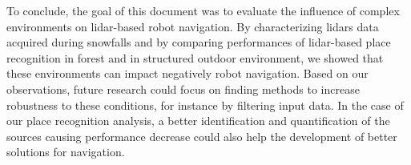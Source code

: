 To conclude, the goal of this document was to evaluate the influence of complex environments on \gls*{lidar}-based robot navigation. By characterizing \gls*{lidar}s data acquired during snowfalls and by comparing performances of \gls*{lidar}-based place recognition in forest and in structured outdoor environment, we showed that these environments can impact negatively robot navigation. Based on our observations, future research could focus on finding methods to increase robustness to these conditions, for instance by filtering input data. In the case of our place recognition analysis, a better identification and quantification of the sources causing performance decrease could also help the development of better solutions for navigation.
